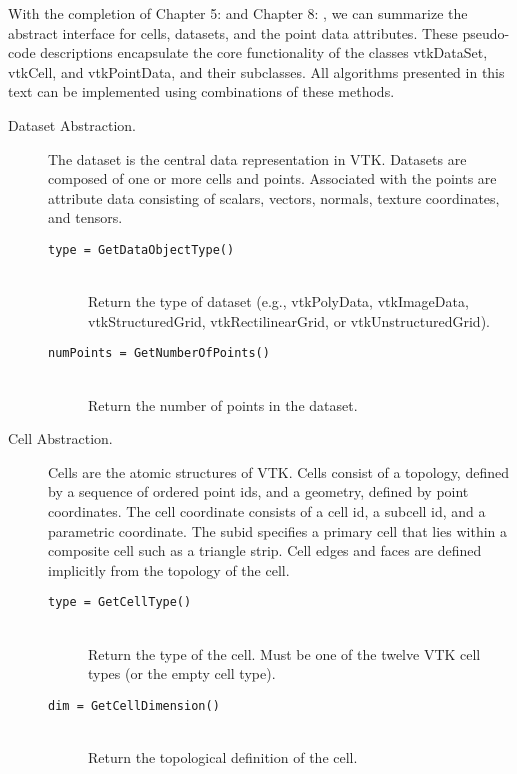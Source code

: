 With the completion of Chapter 5:  and Chapter 8: , we can summarize the abstract interface for cells, datasets, and the point data attributes. These pseudo-code descriptions encapsulate the core functionality of the classes vtkDataSet, vtkCell, and vtkPointData, and their subclasses. All algorithms presented in this text can be implemented using combinations of these methods.

\begin{description}
\item[Dataset Abstraction.] The dataset is the central data representation in VTK. Datasets are composed of one or more cells and points. Associated with the points are attribute data consisting of scalars, vectors, normals, texture coordinates, and tensors.
    \begin{description}
    \item[\texttt{type = GetDataObjectType()}] \hfill \\
    Return the type of dataset (e.g., vtkPolyData, vtkImageData, vtkStructuredGrid, vtkRectilinearGrid, or vtkUnstructuredGrid).
    \item[\texttt{numPoints = GetNumberOfPoints()}] \hfill \\
    Return the number of points in the dataset.
    \end{description}


\item[Cell Abstraction.] Cells are the atomic structures of VTK. Cells consist of a topology, defined by a sequence of ordered point ids, and a geometry, defined by point coordinates. The cell coordinate consists of a cell id, a subcell id, and a parametric coordinate. The subid specifies a primary cell that lies within a composite cell such as a triangle strip. Cell edges and faces are defined implicitly from the topology of the cell.
    \begin{description}
    \item[\texttt{type = GetCellType()}] \hfill \\
    Return the type of the cell. Must be one of the twelve VTK cell types (or the empty cell type).
    \item[\texttt{dim = GetCellDimension()}] \hfill \\
    Return the topological definition of the cell.
    \end{description}


\end{description}
